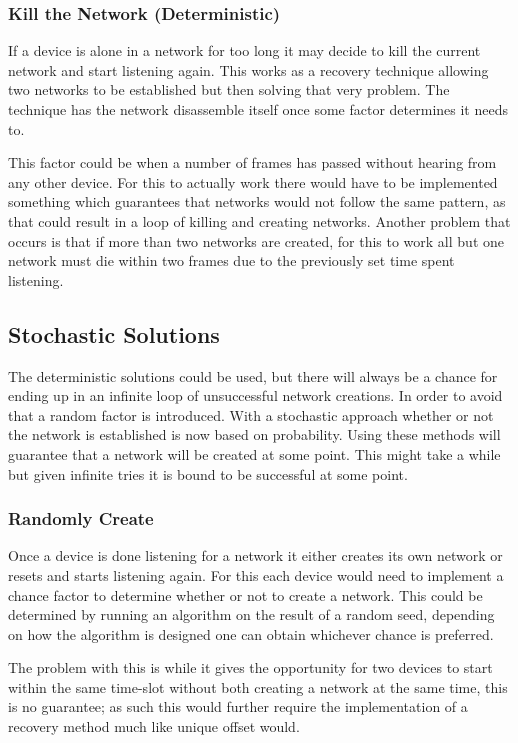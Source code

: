 \subsubsection{Kill the Network (Deterministic)}\label{KtN}
If a device is alone in a network for too long it may decide to kill the current network and start listening again.
This works as a recovery technique allowing two networks to be established but then solving that very problem.
The technique has the network disassemble itself once some factor determines it needs to.

This factor could be when a number of frames has passed without hearing from any other device.
For this to actually work there would have to be implemented something which guarantees that networks would not follow the same pattern, as that could result in a loop of killing and creating networks.
Another problem that occurs is that if more than two networks are created, for this to work all but one network must die within two frames due to the previously set time spent listening.

\subsection{Stochastic Solutions}
The deterministic solutions could be used, but there will always be a chance for ending up in an infinite loop of unsuccessful network creations.
In order to avoid that a random factor is introduced.
With a stochastic approach whether or not the network is established is now based on probability.
Using these methods will guarantee that a network will be created at some point.
This might take a while but given infinite tries it is bound to be successful at some point.


\subsubsection{Randomly Create}\label{RCreate}
Once a device is done listening for a network it either creates its own network or resets and starts listening again.
For this each device would need to implement a chance factor to determine whether or not to create a network.
This could be determined by running an algorithm on the result of a random seed, depending on how the algorithm is designed one can obtain whichever chance is preferred.

The problem with this is while it gives the opportunity for two devices to start within the same time-slot without both creating a network at the same time, this is no guarantee; as such this would further require the implementation of a recovery method much like unique offset would.

